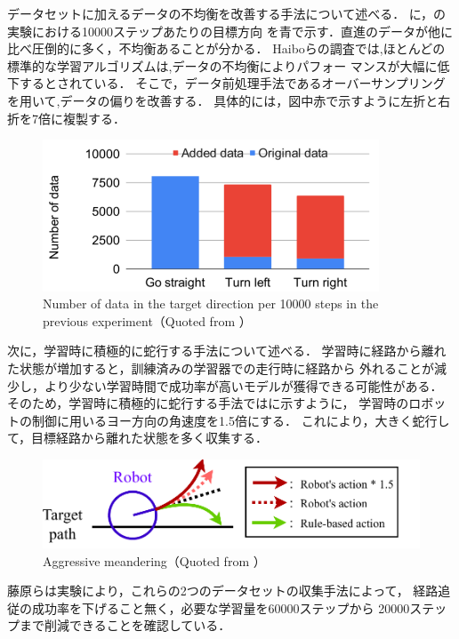 データセットに加えるデータの不均衡を改善する手法について述べる．
に，の実験における10000ステップあたりの目標方向
を青で示す．直進のデータが他に比べ圧倒的に多く，不均衡あることが分かる．
Haiboらの調査\cite{hukinko}では,ほとんどの標準的な学習アルゴリズムは,データの不均衡によりパフォー
マンスが大幅に低下するとされている．
そこで，データ前処理手法であるオーバーサンプリングを用いて,データの偏りを改善する．
具体的には，図中赤で示すように左折と右折を7倍に複製する．
\vspace{3zh}
\begin{figure}[htbp]
    \centering
     \includegraphics[width=100mm]{images/pdf/oversmple.pdf}
     \caption[Number of data in the target direction per 10000 steps
     in the previous experiment]{Number of data in the target direction per 10000 steps
     in the previous experiment（Quoted from \cite{fujiwara2023}）}\label{fig:oversmple}
\end{figure}
\clearpage
次に，学習時に積極的に蛇行する手法について述べる．
学習時に経路から離れた状態が増加すると，訓練済みの学習器での走行時に経路から
外れることが減少し，より少ない学習時間で成功率が高いモデルが獲得できる可能性がある．
そのため，学習時に積極的に蛇行する手法ではに示すように，
学習時のロボットの制御に用いるヨー方向の角速度を1.5倍にする．
これにより，大きく蛇行して，目標経路から離れた状態を多く収集する．
\vspace{3zh}
\begin{figure}[htbp]
    \centering
     \includegraphics[width=130mm]{images/pdf/dakou.pdf}
     \caption[Aggressive meandering]{Aggressive meandering（Quoted from \cite{fujiwara2023}）}\label{fig:dakou}
\end{figure}
藤原らは実験により，これらの2つのデータセットの収集手法によって，
経路追従の成功率を下げること無く，必要な学習量を60000ステップから
20000ステップまで削減できることを確認している．
\newpage


